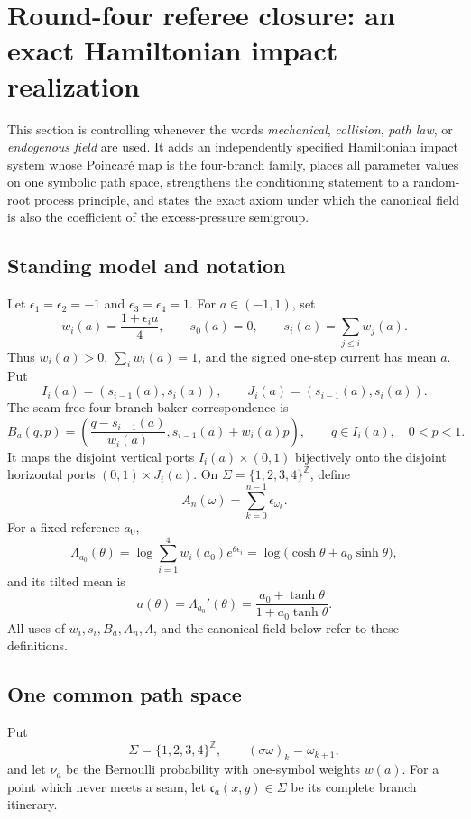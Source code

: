 \section{Round-four referee closure: an exact Hamiltonian impact realization}
\label{sec:r3-a1}

This section is controlling whenever the words \emph{mechanical},
\emph{collision}, \emph{path law}, or \emph{endogenous field} are used.  It
adds an independently specified Hamiltonian impact system whose Poincar\'e map
is the four-branch family, places all parameter values on one symbolic path
space, strengthens the conditioning statement to a random-root process
principle, and states the exact axiom under which the canonical field is also
the coefficient of the excess-pressure semigroup.

\subsection{Standing model and notation}

Let \(\epsilon_1=\epsilon_2=-1\) and
\(\epsilon_3=\epsilon_4=1\).  For \(a\in(-1,1)\), set
\[
 w_i(a)=\frac{1+\epsilon_i a}{4},\qquad
 s_0(a)=0,\qquad s_i(a)=\sum_{j\le i}w_j(a).
\]
Thus \(w_i(a)>0\), \(\sum_iw_i(a)=1\), and the signed one-step
current has mean \(a\).  Put
\[
 I_i(a)=(s_{i-1}(a),s_i(a)),\qquad
 J_i(a)=(s_{i-1}(a),s_i(a)).
\]
The seam-free four-branch baker correspondence is
\[
 B_a(q,p)=\left(
 \frac{q-s_{i-1}(a)}{w_i(a)},
 s_{i-1}(a)+w_i(a)p
 \right),\qquad q\in I_i(a),\quad 0<p<1.
\]
It maps the disjoint vertical ports \(I_i(a)\times(0,1)\) bijectively onto
the disjoint horizontal ports \((0,1)\times J_i(a)\).  On
\(\Sigma=\{1,2,3,4\}^{\mathbb Z}\), define
\[
 A_n(\omega)=\sum_{k=0}^{n-1}\epsilon_{\omega_k}.
\]
For a fixed reference \(a_0\),
\[
 \Lambda_{a_0}(\theta)
 =\log\sum_{i=1}^4w_i(a_0)e^{\theta\epsilon_i}
 =\log\big(\cosh\theta+a_0\sinh\theta\big),
\]
and its tilted mean is
\[
 a(\theta)=\Lambda_{a_0}'(\theta)
 =\frac{a_0+\tanh\theta}{1+a_0\tanh\theta}.
\]
All uses of \(w_i,s_i,B_a,A_n,\Lambda\), and the canonical field below refer
to these definitions.

\subsection{One common path space}

Put
\[
 \Sigma=\{1,2,3,4\}^{\mathbb Z},\qquad
 (\sigma\omega)_k=\omega_{k+1},
\]
and let \(\nu_a\) be the Bernoulli probability with one-symbol weights
\(w(a)\).  For a point which never meets a seam, let
\(\mathfrak c_a(x,y)\in\Sigma\) be its complete branch itinerary.

